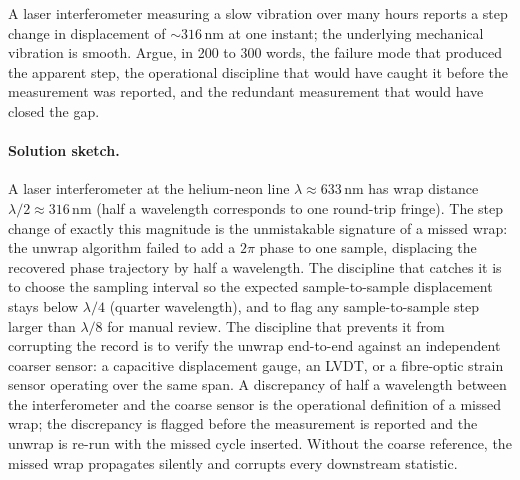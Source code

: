 \begin{exercise}
A laser interferometer measuring a slow vibration over many
hours reports a step change in displacement of $\sim 316 \,\si
{\nano\meter}$ at one instant; the underlying mechanical
vibration is smooth. Argue, in 200 to 300 words, the failure
mode that produced the apparent step, the operational discipline
that would have caught it before the measurement was reported,
and the redundant measurement that would have closed the gap.

\paragraph{Solution sketch.}
A laser interferometer at the helium-neon line $\lambda \approx
633\,\si{\nano\meter}$ has wrap distance $\lambda/2 \approx 316\,
\si{\nano\meter}$ (half a wavelength corresponds to one round-trip
fringe). The step change of exactly this magnitude is the
unmistakable signature of a missed wrap: the unwrap algorithm
failed to add a $2\pi$ phase to one sample, displacing the
recovered phase trajectory by half a wavelength. The discipline
that catches it is to choose the sampling interval so the
expected sample-to-sample displacement stays below $\lambda/4$
(quarter wavelength), and to flag any sample-to-sample step
larger than $\lambda/8$ for manual review. The discipline that
prevents it from corrupting the record is to verify the unwrap
end-to-end against an independent coarser sensor: a capacitive
displacement gauge, an LVDT, or a fibre-optic strain sensor
operating over the same span. A discrepancy of half a wavelength
between the interferometer and the coarse sensor is the
operational definition of a missed wrap; the discrepancy is
flagged before the measurement is reported and the unwrap is
re-run with the missed cycle inserted. Without the coarse
reference, the missed wrap propagates silently and corrupts
every downstream statistic.
\end{exercise}

